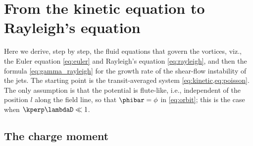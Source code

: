 \section{From the kinetic equation to Rayleigh's equation}\label{app:rayleigh}

Here we derive, step by step, the fluid equations that govern the vortices, viz., the Euler equation \cref{eq:euler} and Rayleigh's equation \cref{eq:rayleigh}, and then the formula \cref{eq:gamma_rayleigh} for the growth rate of the shear-flow instability of the jets. The starting point is the transit-averaged system \cref{eq:kinetic,eq:poisson}. The only assumption is that the potential is flute-like, i.e., independent of the position \(l\) along the field line, so that \(\phibar = \phi\) in \cref{eq:orbit}; this is the case when \(\kperp\lambdaD\ll1\).

\subsection{The charge moment}\label{app:rayleigh_moment}

